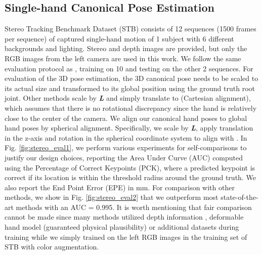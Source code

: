 \documentclass[10pt,twocolumn,letterpaper]{article}
\begin{document}
\subsection{Single-hand Canonical Pose Estimation}\label{sec:experiments_can}
\indent Stereo Tracking Benchmark Dataset (STB) consists of 12 sequences (1500 frames per sequence) of captured single-hand motion of 1 subject with 6 different backgrounds and lighting. Stereo and depth images are provided, but only the RGB images from the left camera are used in this work. We follow the same evaluation protocol as \cite{Zimmermann}, training on 10 and testing on the other 2 sequences. For evaluation of the 3D pose estimation, the 3D canonical pose needs to be scaled to its actual size and transformed to its global position using the ground truth root joint. Other methods scale  by \textbf{\textit{L}} and simply translate  to  (Cartesian alignment), which assumes that there is no rotational discrepancy since the hand is relatively close to the center of the camera. We align our canonical hand poses to global hand poses by spherical alignment. Specifically, we scale  by \textbf{\textit{L}}, apply translation in the z-axis and rotation in the spherical coordinate system to align  with . In Fig. \ref{fig:stereo_eval1}, we perform various experiments for self-comparisons to justify our design choices, reporting the Area Under Curve (AUC) computed using the Percentage of Correct Keypoints (PCK), where a predicted keypoint is correct if its location is within the threshold radius around the ground truth. We also report the End Point Error (EPE) in mm. For comparison with other methods, we show in Fig. \ref{fig:stereo_eval2} that we outperform most state-of-the-art methods with an AUC = 0.995. It is worth mentioning that fair comparison cannot be made since many methods utilized depth information \cite{Ge2,Cai,Iqbal}, deformable hand model (guaranteed physical plausibility) \cite{Ge2,Baek} or additional datasets \cite{Ge2,Baek,Xiang} during training while we simply trained on the left RGB images in the training set of STB with color augmentation.\\
\end{document}
